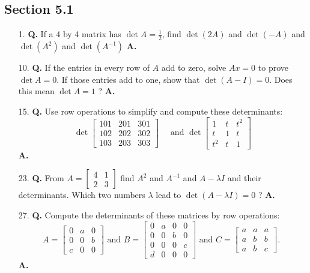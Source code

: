 \documentclass[main.tex]{subfiles}
\begin{document}
\subsection{Section 5.1}
\begin{enumerate}
    \item [1.] \textbf{Q.} If a 4 by 4 matrix has $\operatorname{det} A=\frac{1}{2}$, find $\operatorname{det}(2 A)$ and $\operatorname{det}(-A)$ and $\operatorname{det}\left(A^{2}\right)$ and $\operatorname{det}\left(A^{-1}\right)$ \textbf{A.}
    
    \item [10.] \textbf{Q.} If the entries in every row of $A$ add to zero, solve $A x=0$ to prove $\operatorname{det} A=0$. If those entries add to one, show that $\operatorname{det}(A-I)=0$. Does this mean $\operatorname{det} A=1$ ? \textbf{A.}
    
    \item [15.] \textbf{Q.} Use row operations to simplify and compute these determinants:
    $$
    \operatorname{det}\left[\begin{array}{lll}
    101 & 201 & 301 \\
    102 & 202 & 302 \\
    103 & 203 & 303
    \end{array}\right] \quad \text { and } \operatorname{det}\left[\begin{array}{ccc}
    1 & t & t^{2} \\
    t & 1 & t \\
    t^{2} & t & 1
    \end{array}\right]
    $$
    \textbf{A.}
    
    \item [23.] \textbf{Q.} From $A=\left[\begin{array}{ll}4 & 1 \\ 2 & 3\end{array}\right]$ find $A^{2}$ and $A^{-1}$ and $A-\lambda I$ and their determinants. Which two numbers $\lambda$ lead to $\operatorname{det}(A-\lambda I)=0$ ? \textbf{A.}
    
    \item [27.] \textbf{Q.} Compute the determinants of these matrices by row operations:
    $$
    A=\left[\begin{array}{lll}
    0 & a & 0 \\
    0 & 0 & b \\
    c & 0 & 0
    \end{array}\right] \text { and } B=\left[\begin{array}{cccc}
    0 & a & 0 & 0 \\
    0 & 0 & b & 0 \\
    0 & 0 & 0 & c \\
    d & 0 & 0 & 0
    \end{array}\right] \text { and } C=\left[\begin{array}{ccc}
    a & a & a \\
    a & b & b \\
    a & b & c
    \end{array}\right] \text {. }
    $$
    \textbf{A.}
    
\end{enumerate}
\end{document}
